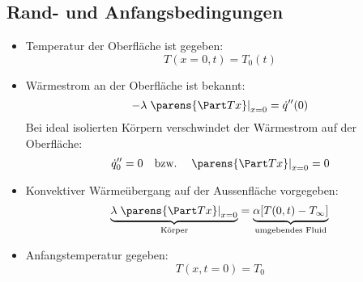 	\subsection{Rand- und Anfangsbedingungen} %
		\begin{itemize}
			\item Temperatur der Oberfläche ist gegeben:
				\[
					T(x=0,t) = T_0(t)
				\]
			\item Wärmestrom an der Oberfläche ist bekannt:
				\[
					-\lambda \left.\parens{\Part T x}\right|_{x=0} = \dot q''(0)
				\]
				Bei ideal isolierten Körpern verschwindet der Wärmestrom auf der Oberfläche:
				\[
					\dot q_0'' = 0 \quad \text{bzw.} \quad \left.\parens{\Part T x}\right|_{x=0} = 0
				\]
			\item Konvektiver Wärmeübergang auf der Aussenfläche vorgegeben:
				\[
					\underbrace{\lambda \left.\parens{\Part T x}\right|_{x=0}}_\text{Körper} = \underbrace{\alpha [T(0,t) - T_\infty] \vphantom{\left.\parens{\Part T x}\right|_{x=0}}}_\text{umgebendes Fluid}
				\]
			\item Anfangstemperatur gegeben:
			\[
				T(x,t=0) = T_0
			\]
		\end{itemize}
